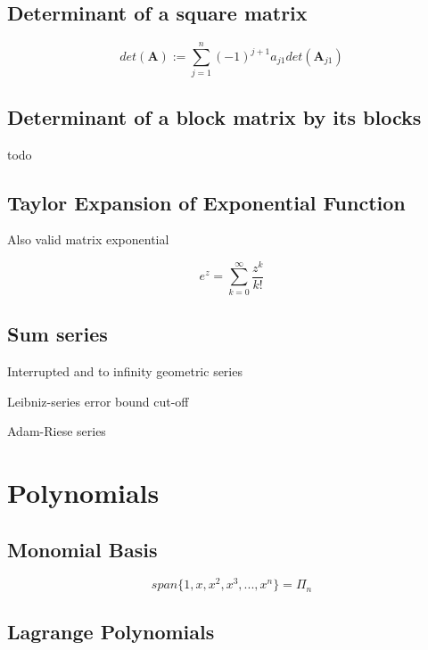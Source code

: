 \documentclass[
    a4paper,
    11pt
]{article}
\begin{document}
\subsection{Determinant of a square matrix}

\begin{equation}
    det(\mathbf{A}) := \sum_{j=1}^{n} (-1)^{j+1} a_{j1} det(\mathbf{A}_{j1})
\end{equation}

\subsection{Determinant of a block matrix by its blocks}

todo

\subsection{Taylor Expansion of Exponential Function}

Also valid matrix exponential

\begin{equation}
    e^z = \sum_{k=0}^{\infty} \frac{z^k}{k!}
\end{equation}

\subsection{Sum series}

Interrupted and to infinity geometric series

Leibniz-series error bound cut-off

Adam-Riese series


\section{Polynomials}

\subsection{Monomial Basis}

\begin{equation}
    span\{1, x, x^2, x^3, ..., x^n\} = \Pi_n
\end{equation}

\subsection{Lagrange Polynomials}
\end{document}
